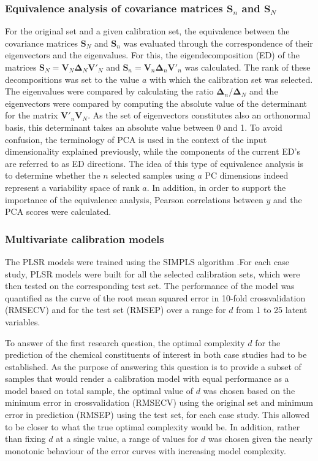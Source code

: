 \documentclass[journal=ancham,manuscript=article]{achemso}
\begin{document}
\subsubsection{Equivalence analysis of covariance matrices $\mathbf{S}_n$ and $\mathbf{S}_N$}

For the original set and a given calibration set, the equivalence between the covariance matrices $\mathbf{S}_N$ and $\mathbf{S}_n$ was evaluated through the correspondence of their eigenvectors and the eigenvalues. For this, the eigendecomposition (ED) of the matrices $\mathbf{S}_N = \mathbf{V}_N \mathbf{\Delta}_N \mathbf{V}'_N$ and $\mathbf{S}_n = \mathbf{V}_n \mathbf{\Delta}_n \mathbf{V}'_n$ was calculated. The rank of these decompositions was set to the value $a$ with which the calibration set was selected. The eigenvalues were compared by calculating the ratio  $\mathbf{\Delta}_n/\mathbf{\Delta}_N$ and the eigenvectors were compared by computing the absolute value of the determinant for the matrix $\mathbf{V}'_n\mathbf{V}_N$. As the set of eigenvectors constitutes also an orthonormal basis, this determinant takes an absolute value between 0 and 1. To avoid confusion, the terminology of PCA is used in the context of the input dimensionality explained previously, while the components of the current ED's are referred to as ED directions. The idea of this type of equivalence analysis is to determine whether the $n$ selected samples using $a$ PC dimensions indeed represent a variability space of rank $a$. In addition, in order to support the importance of the equivalence analysis, Pearson correlations between $y$ and the PCA scores were calculated.

\subsubsection{Multivariate calibration models}

The PLSR models were trained using the SIMPLS algorithm \cite{DeJong1993}.For each case study, PLSR models were built for all the selected calibration sets, which were then tested on the corresponding test set. The performance of the model was quantified as the curve of the root mean squared error in 10-fold crossvalidation (RMSECV) and for the test set (RMSEP) over a range for $d$ from 1 to 25 latent variables. 

To answer of the first research question, the optimal complexity $d$ for the prediction of the chemical constituents of interest in both case studies had
to be established. As the purpose of answering this question is to provide a subset of samples that would render a calibration model with equal performance as a model based on total sample, the optimal value of $d$ was chosen based on the minimum error in crossvalidation (RMSECV) using the original set and minimum error in prediction (RMSEP) using the test set, for each case study. This allowed to be closer to what the true optimal complexity would be. In addition, rather than fixing $d$ at a single value, a range of values for $d$ was chosen given the nearly monotonic behaviour of the error curves with increasing model complexity. 
\end{document}
